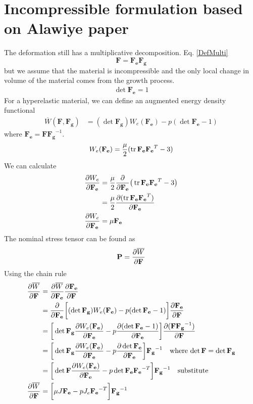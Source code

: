 \documentclass[12pt,3p]{article}
\numberwithin{equation}{section}
\begin{document}
\section{Incompressible formulation based on Alawiye paper}
The deformation still has a multiplicative decomposition. Eq. \ref{DefMulti}
\begin{equation*}
\mathbf{F} = \mathbf{F_e} \mathbf{F_g}
\end{equation*}
but we assume that the material is incompressible and the only local change in volume of the material comes from the growth process. 
\begin{align}
\det \mathbf{F_e} = 1
\end{align}
For a hyperelastic material, we can define an augmented energy density functional 
\begin{align}
\overline{W} (\mathbf{F}, \mathbf{F_g}) &= (\det \mathbf{F_g}) W_e (\mathbf{F_e}) - p (\det \mathbf{F_e} - 1)
\end{align}
where $\mathbf{F_e} = \mathbf{F} \mathbf{F_g}^{-1}$. 
\begin{align}
W_e (\mathbf{F_e}) = \frac{\mu}{2} (\tr \mathbf{F_e} \mathbf{F_e}^T - 3)
\end{align}
We can calculate 
\begin{align*}
\pdv{W_e}{\mathbf{F_e}} &= \frac{\mu}{2} \pdv{}{\mathbf{F_e}} \big( \tr \mathbf{F_e} \mathbf{F_e}^T - 3 \big) \\
	&= \frac{\mu}{2} \pdv{(\tr \mathbf{F_e} \mathbf{F_e}^T)}{\mathbf{F_e}} \\
\pdv{W_e}{\mathbf{F_e}} &= \mu \mathbf{F_e}
\end{align*}
The nominal stress tensor can be found as 
\begin{align*}
\mathbf{P} = \pdv{\overline{W}}{\mathbf{F}}
\end{align*}
Using the chain rule
\begin{align*}
\pdv{\overline{W}}{\mathbf{F}} &= \pdv{\overline{W}}{\mathbf{F_e}} \pdv{\mathbf{F_e}}{\mathbf{F}} \\
						&= \pdv{}{\mathbf{F_e}} \bigg[ (\det \mathbf{F_g}) W_e (\mathbf{F_e}) - p (\det \mathbf{F_e} - 1) \bigg] \pdv{\mathbf{F_e}}{\mathbf{F}} \\
						&= \bigg[ \det \mathbf{F_g} \pdv{W_e (\mathbf{F_e})}{\mathbf{F_e}} - p \pdv{(\det \mathbf{F_e} - 1)}{\mathbf{F_e}} \bigg] \pdv{(\mathbf{F} \mathbf{F_g}^{-1})}{\mathbf{F}} \\
						&= \bigg[ \det \mathbf{F_g} \pdv{W_e (\mathbf{F_e})}{\mathbf{F_e}} - p \pdv{\det \mathbf{F_e}}{\mathbf{F_e}} \bigg] \mathbf{F_g}^{-1} \quad \text{where} \, \det \mathbf{F} = \det \mathbf{F_g}\\
						&= \bigg[ \det \mathbf{F} \pdv{W_e (\mathbf{F_e})}{\mathbf{F_e}} - p \det \mathbf{F_e} \mathbf{F_e}^{-T} \bigg] \mathbf{F_g}^{-1} \quad \text{substitute} \\
\pdv{\overline{W}}{\mathbf{F}} &= \bigg[ \mu J \mathbf{F_e} - p J_e \mathbf{F_e}^{-T} \bigg] \mathbf{F_g}^{-1}
\end{align*}
\end{document}
